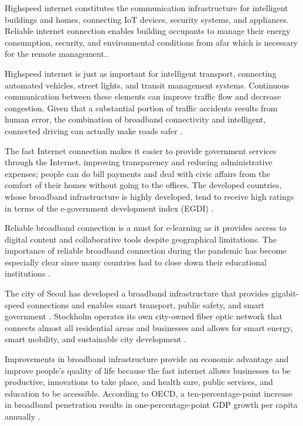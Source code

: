 \documentclass[pdflatex,sn-mathphys-num]{sn-jnl}%
\theoremstyle{thmstyleone}%
\theoremstyle{thmstyletwo}%
\theoremstyle{thmstylethree}%
\begin{document}
Highspeed internet constitutes the communication infrastructure for intelligent buildings and homes, connecting IoT devices, security systems, and appliances. Reliable internet connection enables building occupants to manage their energy consumption, security, and environmental conditions from afar which is necessary for the remote management.\cite{r23}.

Highspeed internet is just as important for intelligent transport, connecting automated vehicles, street lights, and transit management systems. Continuous communication between these elements can improve traffic flow and decrease congestion. Given that a substantial portion of traffic accidents results from human error, the combination of broadband connectivity and intelligent, connected driving can actually make roads safer \cite{r24}.

The fast Internet connection makes it easier to provide government services through the Internet, improving transparency and reducing administrative expenses; people can do bill payments and deal with civic affairs from the comfort of their homes without going to the offices. The developed countries, whose broadband infrastructure is highly developed, tend to receive high ratings in terms of the e-government development index (EGDI) \cite{r25}.

Reliable broadband connection is a must for e-learning as it provides access to digital content and collaborative tools despite geographical limitations. The importance of reliable broadband connection during the pandemic has become especially clear since many countries had to close down their educational institutions \cite{r26}.

The city of Seoul has developed a broadband infrastructure that provides gigabit-speed connections and enables smart transport, public safety, and smart government \cite{r27}. Stockholm operates its own city-owned fiber optic network that connects almost all residential areas and businesses and allows for smart energy, smart mobility, and sustainable city development \cite{r28}.

Improvements in broadband infrastructure provide an economic advantage and improve people’s quality of life because the fast internet allows businesses to be productive, innovations to take place, and health care, public services, and education to be accessible. According to OECD, a ten-percentage-point increase in broadband penetration results in one-percentage-point GDP growth per capita annually \cite{r29}.
\end{document}
